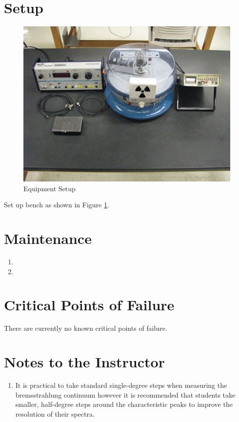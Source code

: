 \section{Setup}
\begin{figure}
\includegraphics{X-Ray-Diffraction-Setup.jpg}
\caption{Equipment Setup}
\label{pic:XRsetup}
\end{figure}

Set up bench as shown in Figure \ref{pic:XRsetup}.

\section{Maintenance}

\begin{enumerate}
\item 
\item 
\end{enumerate}

\section{Critical Points of Failure}

There are currently no known critical points of failure.

\section{Notes to the Instructor}
\begin{enumerate}
\item It is practical to take standard single-degree steps when measuring the bremsstrahlung continuum however it is recommended that students take smaller, half-degree steps around the characteristic peaks to improve the resolution of their spectra.
\end{enumerate}

